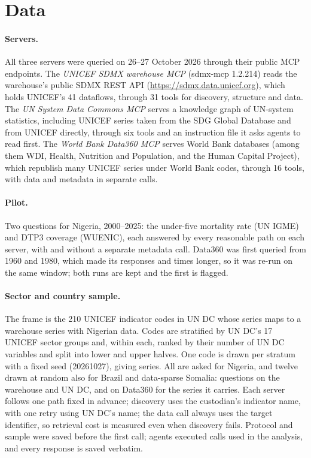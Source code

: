 \documentclass[11pt,a4paper]{article}
\begin{document}
\section{Data}\label{sec:data}

\paragraph{Servers.} All three servers were queried on 26--27 October 2026 through their public MCP endpoints. The \emph{UNICEF SDMX warehouse MCP} (sdmx-mcp 1.2.214) reads the warehouse's public SDMX REST API (\url{https://sdmx.data.unicef.org}), which holds UNICEF's 41 dataflows, through 31 tools for discovery, structure and data. The \emph{UN System Data Commons MCP} serves a knowledge graph of UN-system statistics, including UNICEF series taken from the SDG Global Database and from UNICEF directly, through six tools and an instruction file it asks agents to read first. The \emph{World Bank Data360 MCP} serves World Bank databases (among them WDI, Health, Nutrition and Population, and the Human Capital Project), which republish many UNICEF series under World Bank codes, through 16 tools, with data and metadata in separate calls.

\paragraph{Pilot.} Two questions for Nigeria, 2000--2025: the under-five mortality rate (UN IGME) and DTP3 coverage (WUENIC), each answered by every reasonable path on each server, with and without a separate metadata call. Data360 was first queried from 1960 and 1980, which made its responses \dWinU{} and \dWinD{} times longer, so it was re-run on the same window; both runs are kept and the first is flagged.

\paragraph{Sector and country sample.} The frame is the 210 UNICEF indicator codes in UN DC whose series maps to a warehouse series with Nigerian data. Codes are stratified by UN DC's 17 UNICEF sector groups and, within each, ranked by their number of UN DC variables and split into lower and upper halves. One code is drawn per stratum with a fixed seed (20261027), giving \nSeries{} series. All are asked for Nigeria, and twelve drawn at random also for Brazil and data-sparse Somalia: \nQuestions{} questions on the warehouse and UN DC, and \nQuestionsD{} on Data360 for the \dSeries{} series it carries. Each server follows one path fixed in advance; discovery uses the custodian's indicator name, with one retry using UN DC's name; the data call always uses the target identifier, so retrieval cost is measured even when discovery fails. Protocol and sample were saved before the first call; agents executed \callsUsed{} calls used in the analysis, and every response is saved verbatim.
\end{document}
